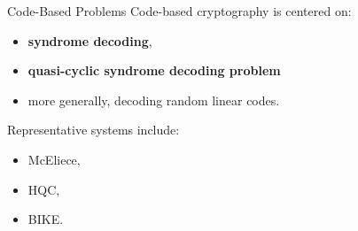 \documentclass[serif, aspectratio=169]{beamer}
\begin{document}
%	

\begin{frame}{Code-Based Problems}
	Code-based cryptography is centered on:
	\begin{itemize}
		\item \textbf{syndrome decoding},
		\item \textbf{quasi-cyclic syndrome decoding problem}
		\item more generally, decoding random linear codes.
	\end{itemize}
	
	Representative systems include:
	\begin{itemize}
		\item McEliece,
		\item HQC,
		\item BIKE.
	\end{itemize}
	
\end{frame}
\end{document}

